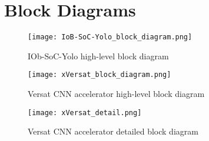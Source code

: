 \documentclass[twocolumn]{iob_pb}
\begin{document}
\section*{\textcolor[rgb]{0,0,0}{Block Diagrams}}

\begin{figure}[H]
  \begin{center}
    \texttt{[image: IoB-SoC-Yolo\_block\_diagram.png]}
    \caption{IOb-SoC-Yolo high-level block diagram}
    \label{fig:IOb-SoC-Yolo}
  \end{center}
\end{figure}


\begin{figure}[H]
  \begin{center}
    \texttt{[image: xVersat\_block\_diagram.png]}
    \caption{Versat CNN accelerator high-level block diagram}
    \label{fig:xVersat_block_diagram}
  \end{center}
\end{figure}

\begin{figure*}[t]
  \begin{center}
    \texttt{[image: xVersat\_detail.png]}
    \caption{Versat CNN accelerator detailed block diagram}
    \label{fig:xVersat_detail}
  \end{center}
\end{figure*}


\end{document}
